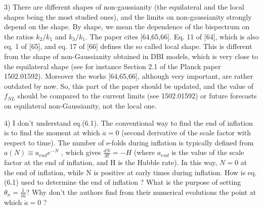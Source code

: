 \documentclass[a4paper,11pt]{article}
\begin{document}
{3) There are different shapes of non-gaussianity (the equilateral and the local shapes being the most studied ones), and the limits on non-gaussianity strongly depend on the shape. By shape, we mean the dependence of the bispectrum on the ratios $k_2/k_1$ and
$k_3/k_1$. The paper cites [64,65,66]. Eq. 11 of [64], which is also eq. 1 of [65], and eq. 17 of [66] defines the so called local shape. This is different from the shape of non-Gaussianity obtained in DBI models, which is very close to the equilateral shape (see for instance Section 2.1 of the Planck paper 1502.01592). Moreover the works [64,65,66], although very important, are rather outdated by now. So, this part of the paper should be updated, and the value of $f_{NL}$ should be compared to the current limits (see 1502.01592) or future forecasts on equilateral non-Gaussianity, not the local one.


4) I don't understand eq.(6.1). The conventional way to find the end
of inflation is to find the moment at which $\ddot a = 0$ (second derivative of the
scale factor with respect to time). The number of e-folds during inflation is
typically defined from $a(N ) \equiv a_{end} e^{-N}$ , which gives  $\frac{dN}{dt} = -H$ (where $a_{end}$ 
is the value of the scale factor at the end of inflation, and H is the Hubble
rate). In this way, $N = 0$ at the end of inflation, while N is positive at
early times during inflation. How is eq. (6.1) used to determine the end of
inflation ?  What is the purpose of setting $\theta_n = \frac{1}{16}$?  Why don't the authors 
find from their numerical evolutions the point at which $\ddot a = 0$ ?\\



}
\end{document}
